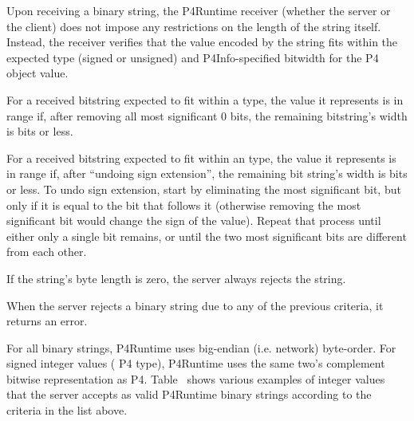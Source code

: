 \documentclass[11pt]{article}
\begin{document}
{%
Upon receiving a binary string, the P4Runtime receiver (whether the server or
the client) does not impose any restrictions on the length of the string
itself. Instead, the receiver verifies that the value encoded by the string fits
within the expected type (signed or unsigned) and P4Info-specified bitwidth for
the P4 object value.%

For a received bitstring expected to fit within a  type, the value it
represents is in range if, after removing all most significant 0 bits, the
remaining bitstring's width is  bits or less.%

For a received bitstring expected to fit within an  type, the value it
represents is in range if, after \textquotedblleft{}undoing sign extension\textquotedblright{}, the remaining bit
string's width is  bits or less. To undo sign extension, start by eliminating
the most significant bit, but only if it is equal to the bit that follows it
(otherwise removing the most significant bit would change the sign of the
value). Repeat that process until either only a single bit remains, or until the
two most significant bits are different from each other.%

If the string's byte length is zero, the server always rejects the string.%

When the server rejects a binary string due to any of the previous criteria,
it returns an  error.%

For all binary strings, P4Runtime uses big-endian (i.e. network) byte-order.
For signed integer values ( P4 type), P4Runtime uses the same two's
complement bitwise representation as P4. Table~
shows various examples of integer values that the server accepts as valid
P4Runtime binary strings according to the criteria in the list above.%

}
\end{document}
